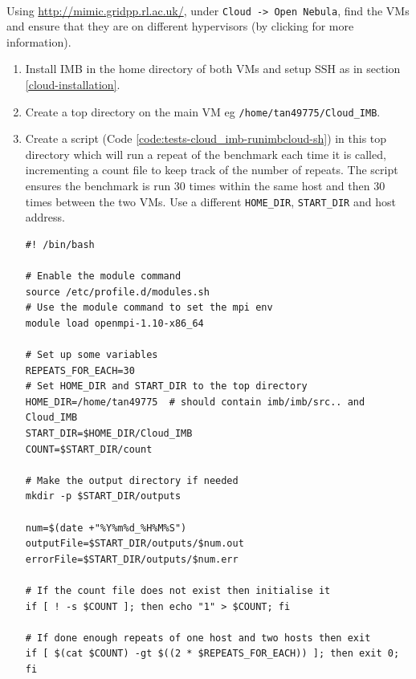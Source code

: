 \documentclass{article}
\newenvironment{code}{\captionsetup{type=listing}}{}
\begin{document}
            \paragraph{}
            Using \url{http://mimic.gridpp.rl.ac.uk/}, under \verb|Cloud -> Open Nebula|, find the VMs and ensure that they are on different hypervisors (by clicking for more information).

            \begin{enumerate}
                \item Install IMB in the home directory of both VMs and setup SSH as in section \ref{cloud-installation}.
                \item Create a top directory on the main VM eg \verb|/home/tan49775/Cloud_IMB|.
                \item Create a script (Code \ref{code:tests-cloud_imb-runimbcloud-sh}) in this top directory which will run a repeat of the benchmark each time it is called, incrementing a count file to keep track of the number of repeats. The script ensures the benchmark is run 30 times within the same host and then 30 times between the two VMs. Use a different \verb|HOME_DIR|, \verb|START_DIR| and host address.
                    \begin{code}
                    \label{code:tests-cloud_imb-runimbcloud-sh}
                    \begin{verbatim}
#! /bin/bash

# Enable the module command
source /etc/profile.d/modules.sh
# Use the module command to set the mpi env
module load openmpi-1.10-x86_64

# Set up some variables
REPEATS_FOR_EACH=30
# Set HOME_DIR and START_DIR to the top directory
HOME_DIR=/home/tan49775  # should contain imb/imb/src.. and Cloud_IMB
START_DIR=$HOME_DIR/Cloud_IMB
COUNT=$START_DIR/count

# Make the output directory if needed
mkdir -p $START_DIR/outputs

num=$(date +"%Y%m%d_%H%M%S")
outputFile=$START_DIR/outputs/$num.out
errorFile=$START_DIR/outputs/$num.err

# If the count file does not exist then initialise it
if [ ! -s $COUNT ]; then echo "1" > $COUNT; fi

# If done enough repeats of one host and two hosts then exit
if [ $(cat $COUNT) -gt $((2 * $REPEATS_FOR_EACH)) ]; then exit 0; fi


\end{verbatim}
\end{code}
\end{enumerate}
\end{document}
